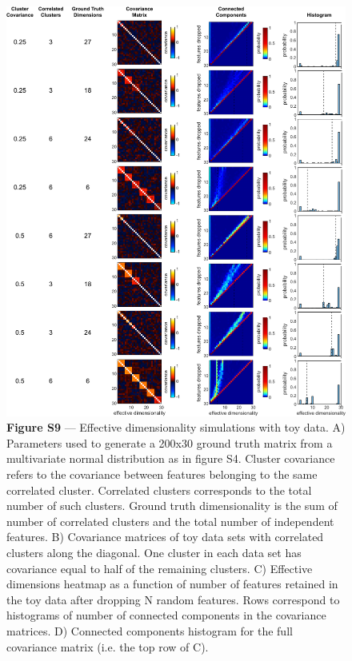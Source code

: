 \documentclass[12pt,letterpaper]{article}
\begin{document}
\begin{figure}[t!]
    \includegraphics[width=\textwidth]{../figures/chapter_3/fig_s9.pdf}
    \vspace{.05in}
    \caption*{\textbf{Figure S9} — Effective dimensionality simulations with toy data. A) Parameters used to generate a 200x30 ground truth matrix from a multivariate normal distribution as in figure S4.  Cluster covariance refers to the covariance between features belonging to the same correlated cluster. Correlated clusters corresponds to the total number of such clusters. Ground truth dimensionality is the sum of number of correlated clusters and the total number of independent features. B) Covariance matrices of toy data sets with correlated clusters along the diagonal. One cluster in each data set has covariance equal to half of the remaining clusters. C) Effective dimensions heatmap as a function of number of features retained in the toy data after dropping N random features. Rows correspond to histograms of number of connected components in the covariance matrices. D) Connected components histogram for the full covariance matrix (i.e. the top row of C).}
\end{figure}
\clearpage
\end{document}
